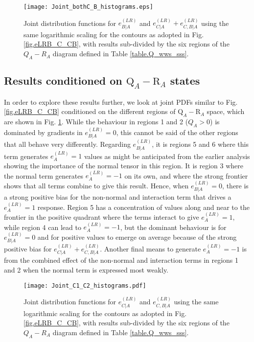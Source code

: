 \documentclass[preprint,amssymb,amsmath,aip,cha]{revtex4-1}
\begin{document}
\begin{figure*}
  \texttt{[image: Joint\_bothC\_B\_histograms.eps]}
\caption{Joint distribution functions for $e^{(LR)}_{B|A}$ and $e^{(LR)}_{C|A} + e^{(LR)}_{C,B|A}$ using the same logarithmic scaling for the contours as adopted in Fig. \ref{fig.eLRB_C_CB}, with results sub-divided by the six regions of the $Q_{A}-R_{A}$ diagram defined in Table \ref{table.Q_wws_sss}.
}
\label{fig.eLRB_C_CB_regions}        %
\end{figure*}

\subsection{Results conditioned on $\mbox{Q}_{A}-\mbox{R}_{A}$ states}
In order to explore these results further, we look at joint PDFs similar to Fig. \ref{fig.eLRB_C_CB} conditioned on the different regions of $\mbox{Q}_{A}-\mbox{R}_{A}$ space, which are shown in Fig. \ref{fig.eLRB_C_CB_regions}. While the behaviour in regions 1 and 2 ($Q_{A} > 0$) is dominated by gradients in $e^{(LR)}_{B|A} = 0$, this cannot be said of the other regions that all behave very differently. Regarding $e^{(LR)}_{B|A}$, it is regions 5 and 6 where this term generates $e^{(LR)}_{A} = 1$ values as might be anticipated from the earlier analysis showing the importance of the normal tensor in this region. It is region 3 where the normal term generates $e^{(LR)}_{A} = -1$ on its own, and where the strong frontier shows that all terms combine to give this result. Hence,  when $e^{(LR)}_{B|A} = 0$, there is a strong positive bias for the non-normal and interaction term that drives a $e^{(LR)}_{A} = 1$ response. Region 5 has a concentration of values along and near to the frontier in the positive quadrant where the terms interact to give $e^{(LR)}_{A} = 1$, while region 4 can lead to $e^{(LR)}_{A} = -1$, but the dominant behaviour is for $e^{(LR)}_{B|A} = 0$ and for positive values to emerge on average because of the strong positive bias for $e^{(LR)}_{C|A} + e^{(LR)}_{C,B|A}$. Another final means to generate $e^{(LR)}_{A} = -1$ is from the combined effect of the non-normal and interaction terms in regions 1 and 2 when the normal term is expressed most weakly.

\begin{figure*}
  \texttt{[image: Joint\_C1\_C2\_histograms.pdf]}
\caption{Joint distribution functions for $e^{(LR)}_{C|A}$ and $e^{(LR)}_{C,B|A}$ using the same logarithmic scaling for the contours as adopted in Fig. \ref{fig.eLRB_C_CB}, with results sub-divided by the six regions of the $Q_{A}-R_{A}$ diagram defined in Table \ref{table.Q_wws_sss}.
}
\label{fig.eLRC1_C2_regions}        %
\end{figure*}
\end{document}
